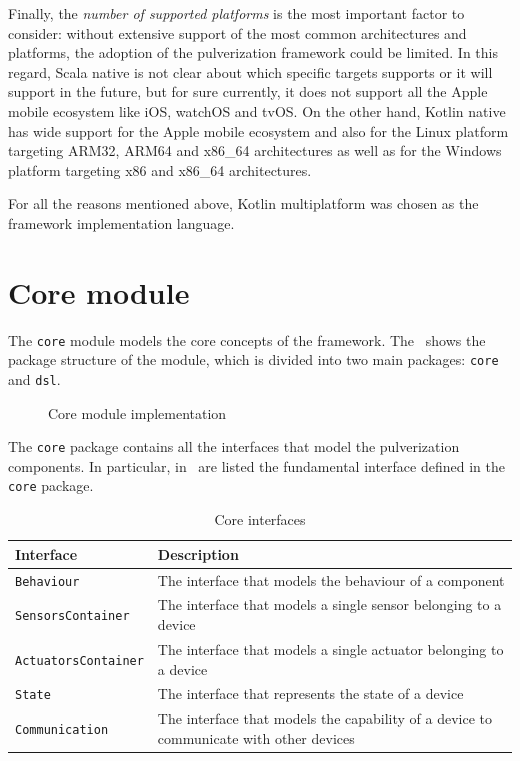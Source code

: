 Finally, the \emph{number of supported platforms} is the most important factor to consider: without extensive support of the most common
architectures and platforms, the adoption of the pulverization framework could be limited.
In this regard, Scala native is not clear about which specific targets supports or it will support in the future, but for sure currently, it does not
support all the Apple mobile ecosystem like iOS, watchOS and tvOS. On the other hand, Kotlin native has wide support for the Apple mobile ecosystem
and also for the Linux platform targeting ARM32, ARM64 and x86\_64 architectures as well as for the Windows platform targeting x86 and x86\_64
architectures.

For all the reasons mentioned above, Kotlin multiplatform was chosen as the framework implementation language.


\section{Core module}
\label{sec:core-module-impl}

The \texttt{core} module models the core concepts of the framework. The~ shows the package structure of the module, which
is divided into two main packages: \texttt{core} and \texttt{dsl}.

\begin{figure}
	\centering
	\caption{Core module implementation}
	\label{fig:core-module-impl}
\end{figure}

The \texttt{core} package contains all the interfaces that model the pulverization components.
In particular, in~ are listed the fundamental interface defined in the \texttt{core} package.

\begin{table}[ht]
	\begin{tabularx}{\textwidth}{l X}
		\toprule
		Interface                   & Description                                                                            \\ \midrule
		\texttt{Behaviour}          & The interface that models the behaviour of a component                                 \\
		\texttt{SensorsContainer}   & The interface that models a single sensor belonging to a device                        \\
		\texttt{ActuatorsContainer} & The interface that models a single actuator belonging to a device                      \\
		\texttt{State}              & The interface that represents the state of a device                                    \\
		\texttt{Communication}      & The interface that models the capability of a device to communicate with other devices \\ \bottomrule
	\end{tabularx}
	\caption{Core interfaces}
	\label{tab:core-interfaces}
\end{table}

